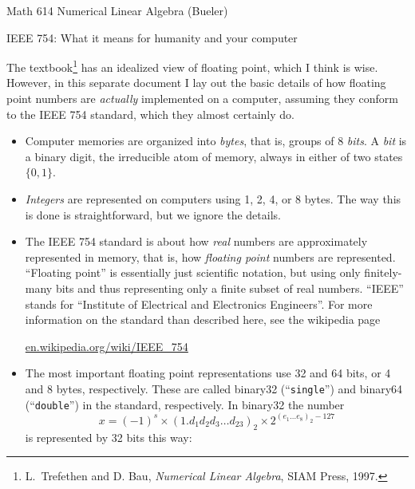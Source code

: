 \documentclass[11pt]{amsart}
\begin{document}
\scriptsize \noindent Math 614 Numerical Linear Algebra (Bueler) \hfill {}
\normalsize

\medskip\bigskip
\LARGE\centerline{IEEE 754: What it means for humanity and your computer}

\bigskip
\normalsize

\thispagestyle{empty}

The textbook\footnote{L.~Trefethen and D. Bau, \emph{Numerical Linear Algebra}, SIAM Press, 1997.} has an idealized view of floating point, which I think is wise.  However, in this separate document I lay out the basic details of how floating point numbers are \emph{actually} implemented on a computer, assuming they conform to the IEEE 754 standard, which they almost certainly do.

\bigskip
\begin{itemize}
\setlength\itemsep{1em}
\item Computer memories are organized into \emph{bytes}, that is, groups of 8 \emph{bits}.  A \emph{bit} is a binary digit, the irreducible atom of memory, always in either of two states $\{0,1\}$.

\item \emph{Integers} are represented on computers using 1, 2, 4, or 8 bytes.  The way this is done is straightforward, but we ignore the details.

\item The IEEE 754 standard is about how \emph{real} numbers are approximately represented in memory, that is, how \emph{floating point} numbers are represented.  ``Floating point'' is essentially just scientific notation, but using only finitely-many bits and thus representing only a finite subset of real numbers.  ``IEEE'' stands for ``Institute of Electrical and Electronics Engineers''.  For more information on the standard than described here, see the wikipedia page

 \centerline{\url{en.wikipedia.org/wiki/IEEE_754}}


\item The most important floating point representations use 32 and 64 bits, or 4 and 8 bytes, respectively.  These are called binary32 (``\texttt{single}'') and binary64 (``\texttt{double}'') in the standard, respectively.  In binary32 the number
       $$x = (-1)^s \times \left(1.d_1 d_2 d_3 \dots d_{23}\right)_{2} \times 2^{\left(e_1\dots e_8\right)_2 - 127}$$
is represented by 32 bits this way:

\medskip
\hspace{-30mm}


\end{itemize}
\end{document}
